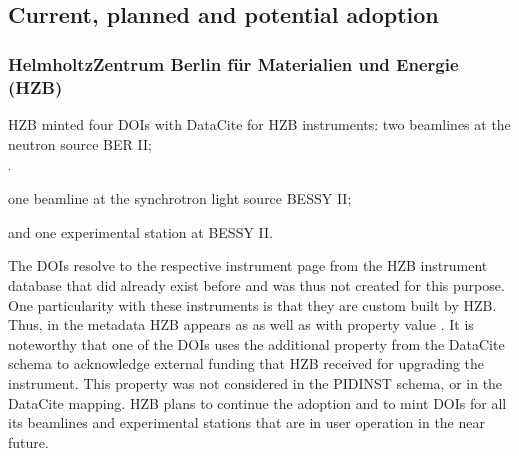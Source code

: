 \documentclass[a4paper,10pt,english]{sphinxmanual}
\begin{document}
\subsection{Current, planned and potential adoption}
\label{\detokenize{white-paper/adoption:current-planned-and-potential-adoption}}\label{\detokenize{white-paper/adoption::doc}}

\subsubsection{Helmholtz\sphinxhyphen{}Zentrum Berlin für Materialien und Energie (HZB)}
\label{\detokenize{white-paper/adoption:helmholtz-zentrum-berlin-fur-materialien-und-energie-hzb}}
\sphinxAtStartPar
HZB minted four DOIs with DataCite for HZB instruments: two beamlines
at the neutron source BER II;%
\begin{footnote}[1]\sphinxAtStartFootnote
{}
%
\end{footnote}$^{\text{,}}$%
\begin{footnote}[2]\sphinxAtStartFootnote
{}
%
\end{footnote} one
beamline at the synchrotron light source BESSY II;%
\begin{footnote}[3]\sphinxAtStartFootnote
{}
%
\end{footnote} and
one experimental station at BESSY II.%
\begin{footnote}[4]\sphinxAtStartFootnote
{}
%
\end{footnote} The DOIs resolve
to the respective instrument page from the HZB instrument database
that did already exist before and was thus not created for this
purpose.  One particularity with these instruments is that they are
custom built by HZB.  Thus, in the metadata HZB appears as 
as well as  with property  value
.  It is noteworthy that one of the DOIs uses the
additional property  from the DataCite schema to
acknowledge external funding that HZB received for upgrading the
instrument.  This property was not considered in the PIDINST schema,
or in the DataCite mapping.  HZB plans to continue the adoption and to
mint DOIs for all its beamlines and experimental stations that are in
user operation in the near future.
\end{document}
